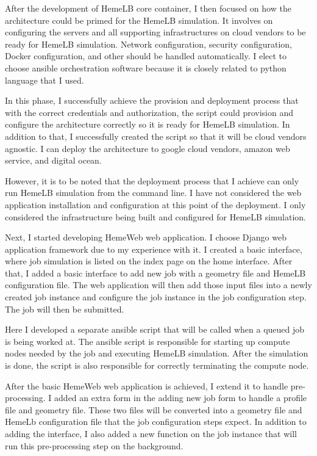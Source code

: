 After the development of HemeLB core container, I then focused on how the architecture could be primed for the HemeLB simulation. It involves on configuring the servers and all supporting infrastructures on cloud vendors to be ready for HemeLB simulation. Network configuration, security configuration, Docker configuration, and other should be handled automatically. I elect to choose ansible orchestration software because it is closely related to python language that I used. 

In this phase, I successfully achieve the provision and deployment process that with the correct credentials and authorization, the script could provision and configure the architecture correctly so it is ready for HemeLB simulation. In addition to that, I successfully created the script so that it will be cloud vendors agnostic. I can deploy the architecture to google cloud vendors, amazon web service, and digital ocean.

However, it is to be noted that the deployment process that I achieve can only run HemeLB simulation from the command line. I have not considered the web application installation and configuration at this point of the deployment. I only considered the infrastructure being built and configured for HemeLB simulation.


Next, I started developing HemeWeb web application. I choose Django web application framework due to my experience with it. I created a basic interface, where job simulation is listed on the index page on the home interface. After that, I added a basic interface to add new job with a geometry file and HemeLB configuration file. The web application will then add those input files into a newly created job instance and configure the job instance in the job configuration step. The job will then be submitted. 

Here I developed a separate ansible script that will be called when a queued job is being worked at. The ansible script is responsible for starting up compute nodes needed by the job and executing HemeLB simulation. After the simulation is done, the script is also responsible for correctly terminating the compute node.

After the basic HemeWeb web application is achieved, I extend it to handle pre-processing. I added an extra form in the adding new job form to handle a profile file and geometry file. These two files will be converted into a geometry file and HemeLb configuration file that the job configuration steps expect. In addition to adding the interface, I also added a new function on the job instance that will run this pre-processing step on the background. 

